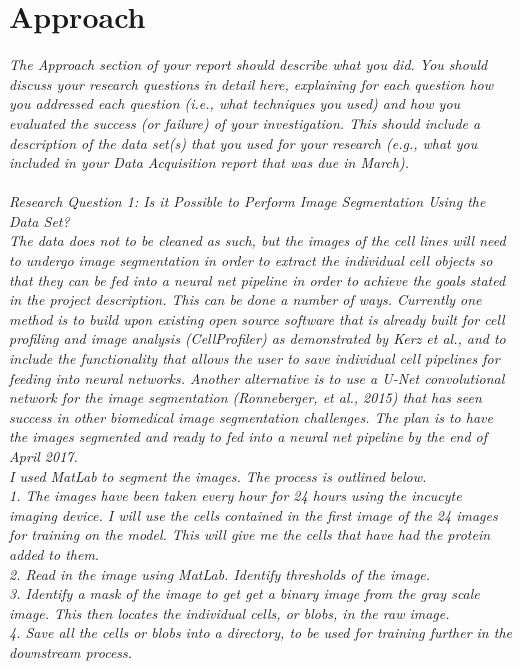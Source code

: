 \section{Approach} 

\emph{The Approach section of your report should describe what you did. You should discuss your research questions in detail here, explaining for each question how you addressed each question (i.e., what techniques you used) and how you evaluated the success (or failure) of your investigation. This should include a description of the data set(s) that you used for your research (e.g., what you included in your Data Acquisition report that was due in March). \\ \\ 
Research Question 1: Is it Possible to Perform Image Segmentation Using the Data Set? \\ The data does not to be cleaned as such, but the images of the cell lines will need to undergo image segmentation in order to extract the individual cell objects so that they can be fed into a neural net pipeline in order to achieve the goals stated in the project description. This can be done a number of ways. Currently one method is to build upon existing open source software that is already built for cell profiling and image analysis (CellProfiler) as demonstrated by Kerz et al., and to include the functionality that allows the user to save individual cell pipelines for feeding into neural networks. Another alternative is to use a U-Net convolutional network for the image segmentation (Ronneberger, et al., 2015) that has seen success in other biomedical image segmentation challenges. The plan is to have the images segmented and ready to fed into a neural net pipeline by the end of April 2017. \\
I used MatLab to segment the images. The process is outlined below. \\
1. The images have been taken every hour for 24 hours using the incucyte imaging device. I will use the cells contained in the first image of the 24 images for training on the model. This will give me the cells that have had the protein added to them. \\
2. Read in the image using MatLab. Identify thresholds of the image. \\
3. Identify a mask of the image to get get a binary image from the gray scale image. This then locates the individual cells, or blobs, in the raw image. \\
4. Save all the cells or blobs into a directory, to be used for training further in the downstream process. \\ \\  
}
